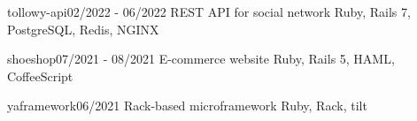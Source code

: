 
\begin{minipage}[t]{\dimexpr(\linewidth/3) - 3em}
\begin{projects}
   \projectoneline
      {tollowy-api}{02/2022 - 06/2022}
      {}
      {REST API for social network}
      {Ruby, Rails 7, PostgreSQL, Redis, NGINX}
\end{projects}
\end{minipage}
\hfill
\begin{minipage}[t]{\dimexpr(\linewidth/3) - 3em}
\begin{projects}
   \projectoneline
      {shoeshop}{07/2021 - 08/2021}
      {}
      {E-commerce website}
      {Ruby, Rails 5, HAML, CoffeeScript}
   \end{projects}
\end{minipage}
\hfill
\begin{minipage}[t]{\dimexpr(\linewidth/3) - 3em}
\begin{projects}
   \projectoneline
      {yaframework}{06/2021}
      {}
      {Rack-based microframework}
      {Ruby, Rack, tilt}
   \end{projects}
\end{minipage}
